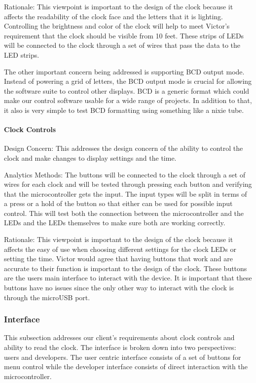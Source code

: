 \documentclass[onecolumn, draftclsnofoot,10pt, compsoc]{IEEEtran}
\begin{document}
\vspace{2mm} Rationale: This viewpoint is important to the design of the clock because it affects the readability of the clock face and the letters that it is lighting.
Controlling the brightness and color of the clock will help to meet Victor's requirement that the clock should be visible from 10 feet.
These strips of LEDs will be connected to the clock through a set of wires that pass the data to the LED strips.

The other important concern being addressed is supporting BCD output mode.
Instead of powering a grid of letters, the BCD output mode is crucial for allowing the software suite to control other displays.
BCD is a generic format which could make our control software usable for a wide range of projects.
In addition to that, it also is very simple to test BCD formatting using something like a nixie tube.
\paragraph{Clock Controls}
\vspace{2mm} Design Concern: This addresses the design concern of the ability to control the clock and make changes to display settings and the time.

\vspace{2mm} Analytics Methods: The buttons will be connected to the clock through a set of wires for each clock and will be tested through pressing each button and verifying that the microcontroller gets the input.
The input types will be split in terms of a press or a hold of the button so that either can be used for possible input control.
This will test both the connection between the microcontroller and the LEDs and the LEDs themselves to make sure both are working correctly.

\vspace{2mm} Rationale: This viewpoint is important to the design of the clock because it affects the easy of use when choosing different settings for the clock LEDs or setting the time.
Victor would agree that having buttons that work and are accurate to their function is important to the design of the clock.
These buttons are the users main interface to interact with the device.
It is important that these buttons have no issues since the only other way to interact with the clock is through the microUSB port.

\subsubsection{Interface}
This subsection addresses our client's requirements about clock controls and ability to read the clock.
The interface is broken down into two perspectives: users and developers.
The user centric interface consists of a set of buttons for menu control while the developer interface consists of direct interaction with the microcontroller.
\vspace{1mm}
\end{document}
